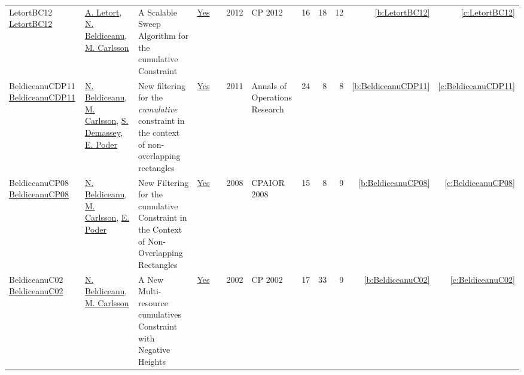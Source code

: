 {\begin{longtable}{>{\raggedright\arraybackslash}p{3cm}>{\raggedright\arraybackslash}p{6cm}>{\raggedright\arraybackslash}p{6.5cm}rrrp{2.5cm}rrrrr}
LetortBC12 \href{https://doi.org/10.1007/978-3-642-33558-7\_33}{LetortBC12} & \hyperref[auth:a128]{A. Letort}, \hyperref[auth:a129]{N. Beldiceanu}, \hyperref[auth:a91]{M. Carlsson} & A Scalable Sweep Algorithm for the cumulative Constraint & \href{works/LetortBC12.pdf}{Yes} & \cite{LetortBC12} & 2012 & CP 2012 & 16 & 18 & 12 & \ref{b:LetortBC12} & \ref{c:LetortBC12}\\
BeldiceanuCDP11 \href{https://doi.org/10.1007/s10479-010-0731-0}{BeldiceanuCDP11} & \hyperref[auth:a129]{N. Beldiceanu}, \hyperref[auth:a91]{M. Carlsson}, \hyperref[auth:a246]{S. Demassey}, \hyperref[auth:a364]{E. Poder} & New filtering for the \emph{cumulative} constraint in the context of non-overlapping rectangles & \href{works/BeldiceanuCDP11.pdf}{Yes} & \cite{BeldiceanuCDP11} & 2011 & Annals of Operations Research & 24 & 8 & 8 & \ref{b:BeldiceanuCDP11} & \ref{c:BeldiceanuCDP11}\\
BeldiceanuCP08 \href{https://doi.org/10.1007/978-3-540-68155-7\_5}{BeldiceanuCP08} & \hyperref[auth:a129]{N. Beldiceanu}, \hyperref[auth:a91]{M. Carlsson}, \hyperref[auth:a364]{E. Poder} & New Filtering for the cumulative Constraint in the Context of Non-Overlapping Rectangles & \href{works/BeldiceanuCP08.pdf}{Yes} & \cite{BeldiceanuCP08} & 2008 & CPAIOR 2008 & 15 & 8 & 9 & \ref{b:BeldiceanuCP08} & \ref{c:BeldiceanuCP08}\\
BeldiceanuC02 \href{https://doi.org/10.1007/3-540-46135-3\_5}{BeldiceanuC02} & \hyperref[auth:a129]{N. Beldiceanu}, \hyperref[auth:a91]{M. Carlsson} & A New Multi-resource cumulatives Constraint with Negative Heights & \href{works/BeldiceanuC02.pdf}{Yes} & \cite{BeldiceanuC02} & 2002 & CP 2002 & 17 & 33 & 9 & \ref{b:BeldiceanuC02} & \ref{c:BeldiceanuC02}\\
\end{longtable}
}

